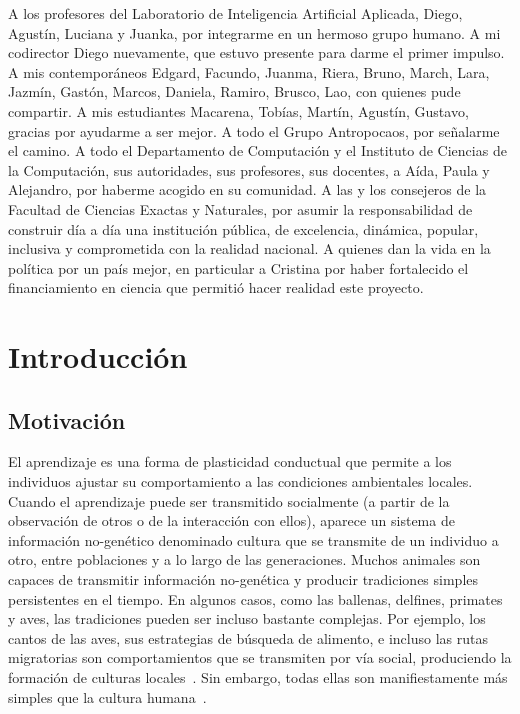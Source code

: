 \documentclass[a4paper,11pt]{book}
\makeatletter
\renewcommand{\mainmatter}{\cleardoublepage\@mainmattertrue}
\theoremstyle{definition}
\makeatother
\begin{document}
%
A los profesores del Laboratorio de Inteligencia Artificial Aplicada, Diego, Agust\'in, Luciana y Juanka, por integrarme en un hermoso grupo humano.
%
A mi codirector Diego nuevamente, que estuvo presente para darme el primer impulso.
%
A mis contempor\'aneos Edgard, Facundo, Juanma, Riera, Bruno, March, Lara, Jazm\'in, Gast\'on, Marcos, Daniela, Ramiro, Brusco, Lao, con quienes pude compartir.
%
A mis estudiantes Macarena, Tob\'ias, Mart\'in, Agust\'in, Gustavo, gracias por ayudarme a ser mejor.
%
A todo el Grupo Antropocaos, por se\~nalarme el camino.
%
A todo el Departamento de Computaci\'on y el Instituto de Ciencias de la Computaci\'on, sus autoridades, sus profesores, sus docentes, a A\'ida, Paula y Alejandro, por haberme acogido en su comunidad.
%
A las y los consejeros de la Facultad de Ciencias Exactas y Naturales, por asumir la responsabilidad de construir d\'ia a d\'ia una instituci\'on p\'ublica, de excelencia, din\'amica, popular, inclusiva y comprometida con la realidad nacional.
%
A quienes dan la vida en la pol\'itica por un pa\'is mejor, en particular a Cristina por haber fortalecido el financiamiento en ciencia que permiti\'o hacer realidad este proyecto.








\mainmatter

\chapter{Introducci\'on} \label{ch_intro}

\section{Motivaci\'on}

El aprendizaje es una forma de plasticidad conductual que permite a los individuos ajustar su comportamiento a las condiciones ambientales locales.
%
Cuando el aprendizaje puede ser transmitido socialmente (a partir de la observaci\'on de otros o de la interacci\'on con ellos), aparece un sistema de informaci\'on no-gen\'etico denominado cultura que se transmite de un individuo a otro, entre poblaciones y a lo largo de las generaciones.
%
Muchos animales son capaces de transmitir informaci\'on no-gen\'etica y producir tradiciones simples persistentes en el tiempo.
%
En algunos casos, como las ballenas, delfines, primates y aves, las tradiciones pueden ser incluso bastante complejas.
%
Por ejemplo, los cantos de las aves, sus estrategias de b\'usqueda de alimento, e incluso las rutas migratorias son comportamientos que se transmiten por v\'ia social, produciendo la formaci\'on de culturas locales~\cite{aplin2022-birdsCulture}.
%
Sin embargo, todas ellas son manifiestamente m\'as simples que la cultura humana~\cite{boyd1996-whyCultureIsCommon}.
\end{document}
